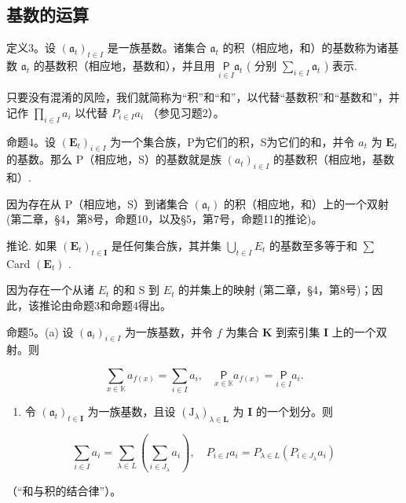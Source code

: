 \subsection{基数的运算}

定义3。设 \((\mathfrak{a}_t)_{t \in I}\) 是一族基数。诸集合 \(\mathfrak{a}_t\) 的积（相应地，和）的基数称为诸基数 \(\mathfrak{a}_t\) 的基数积（相应地，基数和），并且用 \(\underset{i \in I}{\mathsf{P}} \mathfrak{a}_t\) ( \(\text{分别 } \sum_{i \in I} \mathfrak{a}_t\) ) 表示.

只要没有混淆的风险，我们就简称为“积”和“和”，以代替“基数积”和“基数和”，并记作 \(\prod_{i\in I}a_{i}\) 以代替 \(P_{i\in I}a_{i}\) （参见习题2）。

命题4。设 \((\mathbf{E}_t)_{i \in I}\) 为一个集合族，P为它们的积，S为它们的和，并令 \(a_t\) 为 \(\mathbf{E}_t\) 的基数。那么 P（相应地，S）的基数就是族 \((a_t)_{i \in I}\) 的基数积（相应地，基数和）.

因为存在从 P（相应地，S）到诸集合 \((\mathfrak{a}_{t})\) 的积（相应地，和）上的一个双射 (第二章，§4，第8号，命题10，以及§5，第7号，命题11的推论)。

推论. 如果 \((\mathbf{E}_{t})_{t\in\mathbf{I}}\) 是任何集合族，其并集 \(\bigcup_{t\in I}E_{t}\) 的基数至多等于和 \(\sum\) Card \((\mathbf{E}_{t})\) .

因为存在一个从诸 \(E_{t}\) 的和 S 到 \(E_{t}\) 的并集上的映射 (第二章，§4，第8号)；因此，该推论由命题3和命题4得出。

命题5。(a) 设 \((\mathfrak{a}_i)_{i\in I}\) 为一族基数，并令 \(f\) 为集合 \(\mathbf{K}\) 到索引集 \(\mathbf{I}\) 上的一个双射。则

\[
\sum_ {x \in \mathbb {K}} a _ {f (x)} = \sum_ {i \in I} a _ {i}, \quad \underset {x \in \mathbb {K}} {\mathsf {P}} a _ {f (x)} = \underset {i \in I} {\mathsf {P}} a _ {i}.
\]

\begin{enumerate}
\def\labelenumi{(\alph{enumi})}
\setcounter{enumi}{1}
\tightlist
\item
  令 \((\mathfrak{a}_t)_{t\in \mathbf{I}}\) 为一族基数，且设 \((\mathrm{J}_{\lambda})_{\lambda \in \mathbf{L}}\) 为 \(\mathbf{I}\) 的一个划分。则
\end{enumerate}

\[
\sum_ {i \in I} a _ {i} = \sum_ {\lambda \in L} \left(\sum_ {i \in J _ {\lambda}} a _ {i}\right), \quad P _ {i \in I} a _ {i} = P _ {\lambda \in L} \left(P _ {i \in J _ {\lambda}} a _ {i}\right)
\]

（“和与积的结合律”）。

